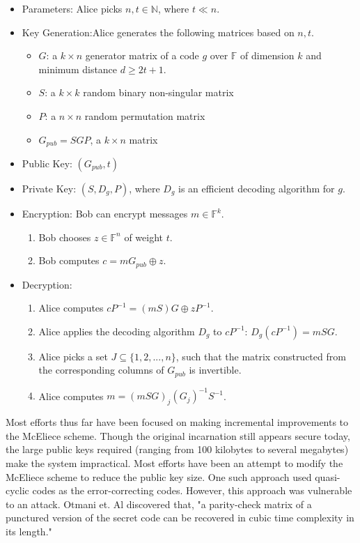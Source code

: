 \documentclass{article}
\begin{document}
\begin{itemize}
	\item Parameters: Alice picks $ n, t \in \mathbb{N} $, where $ t \ll n $.
	\item Key Generation:Alice generates the following matrices based on $ n, t $.
	\begin{itemize}
		\item $ G $: a $ k \times n $ generator matrix of a code $ g $ over $ \mathbb{F} $ of dimension $ k $ and minimum distance $ d \ge 2 t + 1 $.
		\item $ S $: a $ k \times k $ random binary non-singular matrix
		\item $ P $: a $ n \times n $ random permutation matrix 
		\item $ G_{pub} = S G P $, a $ k \times n $ matrix
	\end{itemize}
	\item Public Key: $ (G_{pub}, t) $
	\item Private Key: $ (S, D_g, P) $, where $ D_g $ is an efficient decoding algorithm for $ g $.
	\item Encryption: Bob can encrypt messages $ m \in \mathbb{F}^k $.
	\begin{enumerate}
		\item Bob chooses $ z \in \mathbb{F}^n $ of weight $ t $.
		\item Bob computes $ c = m G_{pub} \oplus z $.
	\end{enumerate}
	\item Decryption:
	\begin{enumerate}
		\item Alice computes $ c P^{-1} = (m S) G \oplus z P^{-1} $.
		\item Alice applies the decoding algorithm $ D_g $ to $ c P^{-1}$: $ D_g(c P^{-1}) = m S G $.
		\item Alice picks a set $ J \subseteq \{ 1, 2, ..., n \} $, such that the matrix constructed from the corresponding columns of $ G_{pub} $ is invertible.
		\item Alice computes $ m = (m S G)_j (G_j)^{-1} S^{-1}$.
	\end{enumerate}
\end{itemize}

Most efforts thus far have been focused on making incremental improvements to the McEliece scheme. Though the original incarnation still appears secure today, the large public keys required (ranging from 100 kilobytes to several megabytes) make the system impractical.\cite{bernstein09}\cite{deneuville17} Most efforts have been an attempt to modify the McEliece scheme to reduce the public key size. One such approach used quasi-cyclic codes as the error-correcting codes. However, this approach was vulnerable to an attack. Otmani et. Al discovered that, "a parity-check matrix of a punctured version of the secret code can be recovered in cubic time complexity in its length."\cite{otmani08}
\end{document}
